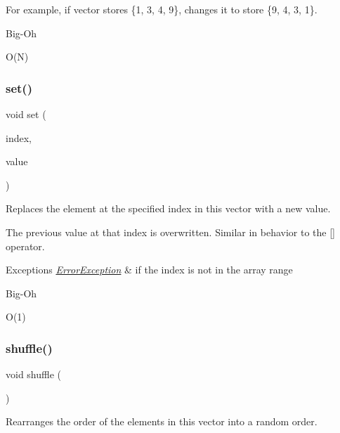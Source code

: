For example, if vector stores \{1, 3, 4, 9\}, changes it to store \{9, 4, 3, 1\}. \begin{DoxyRefDesc}{Big-\/\+Oh}
\item[\mbox{\hyperlink{BigOh__BigOh000127}{Big-\/\+Oh}}]O(\+N) \end{DoxyRefDesc}
\mbox{\label{classVector_a004ea6d6bc4a512ce4d52962727d5db2}} 
\subsubsection{\texorpdfstring{set()}{set()}}
{\footnotesize\ttfamily void set (\begin{DoxyParamCaption}\item[{int}]{index,  }\item[{const Value\+Type \&}]{value }\end{DoxyParamCaption})}



Replaces the element at the specified index in this vector with a new value. 

The previous value at that index is overwritten. Similar in behavior to the \mbox{[}\mbox{]} operator. 
\begin{DoxyExceptions}{Exceptions}
{\em \mbox{\hyperlink{classErrorException}{Error\+Exception}}} & if the index is not in the array range \\
\hline
\end{DoxyExceptions}
\begin{DoxyRefDesc}{Big-\/\+Oh}
\item[\mbox{\hyperlink{BigOh__BigOh000128}{Big-\/\+Oh}}]O(1) \end{DoxyRefDesc}
\mbox{\label{classVector_a1905fe84eb39f020b32c58baf7a76758}} 
\subsubsection{\texorpdfstring{shuffle()}{shuffle()}}
{\footnotesize\ttfamily void shuffle (\begin{DoxyParamCaption}{ }\end{DoxyParamCaption})}



Rearranges the order of the elements in this vector into a random order. 

